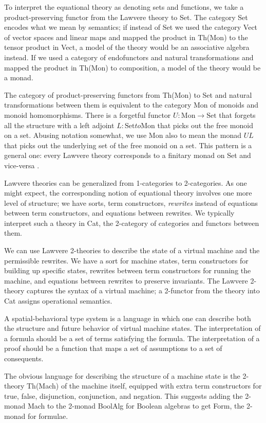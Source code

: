 \documentclass{article}
\newcommand{\maps}{\colon}
\newcommand{\Set}{\mathrm{Set}}
\newcommand{\Mon}{\mathrm{Mon}}
\begin{document}
  To interpret the equational theory as denoting sets and functions, we take a product-preserving functor from the Lawvere theory to Set.  The category Set encodes what we mean by semantics; if instead of Set we used the category Vect of vector spaces and linear maps and mapped the product in Th(Mon) to the tensor product in Vect, a model of the theory would be an associative algebra instead.  If we used a category of endofunctors and natural transformations and mapped the product in Th(Mon) to composition, a model of the theory would be a monad.

  The category of product-preserving functors from Th(Mon) to Set and natural transformations between them is equivalent to the category Mon of monoids and monoid homomorphisms.  There is a forgetful functor $U\maps \Mon \to \Set$ that forgets all the structure with a left adjoint $L\maps \Set to \Mon$ that picks out the free monoid on a set.  Abusing notation somewhat, we use Mon also to mean the monad $UL$ that picks out the underlying set of the free monoid on a set.  This pattern is a general one: every Lawvere theory corresponds to a finitary monad on Set and vice-versa \cite{HylandPower}.

  Lawvere theories can be generalized from 1-categories to 2-categories.  As one might expect, the corresponding notion of equational theory involves one more level of structure; we have sorts, term constructors, {\em rewrites} instead of equations between term constructors, and equations between rewrites.  We typically interpret such a theory in Cat, the 2-category of categories and functors between them.

  We can use Lawvere 2-theories to describe the state of a virtual machine and the permissible rewrites.  We have a sort for machine states, term constructors for building up specific states, rewrites between term constructors for running the machine, and equations between rewrites to preserve invariants.  The Lawvere 2-theory captures the syntax of a virtual machine; a 2-functor from the theory into Cat assigns operational semantics.

  A spatial-behavioral type system is a language in which one can describe both the structure and future behavior of virtual machine states.  The interpretation of a formula should be a set of terms satisfying the formula.  The interpretation of a proof should be a function that maps a set of assumptions to a set of consequents.

  The obvious language for describing the structure of a machine state is the 2-theory Th(Mach) of the machine itself, equipped with extra term constructors for true, false, disjunction, conjunction, and negation.  This suggests adding the 2-monad Mach to the 2-monad BoolAlg for Boolean algebras to get Form, the 2-monad for formulae.
\end{document}
